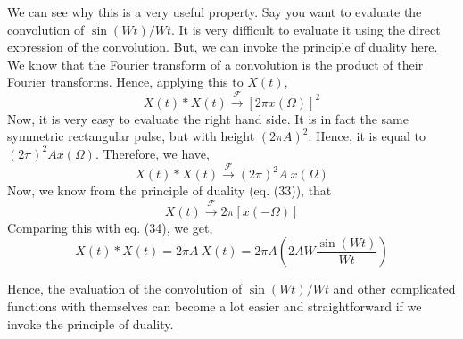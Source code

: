 We can see why this is a very useful property. Say you want to evaluate the convolution of $\sin(Wt)/Wt$. It is very difficult to evaluate it using the direct expression of the convolution. But, we can invoke the principle of duality here. We know that the Fourier transform of a convolution is the product of their Fourier transforms. Hence, applying this to $X(t)$,
\[
X(t)*X(t) \xrightarrow{\mathcal{F}} [2\pi x(\Omega)]^2
\]
Now, it is very easy to evaluate the right hand side. It is in fact the same symmetric rectangular pulse, but with height $(2\pi A)^2$. Hence, it is equal to $(2\pi)^2 A x(\Omega)$. Therefore, we have,
\begin{equation}
X(t)*X(t) \xrightarrow{\mathcal{F}} (2\pi)^2 A \ x(\Omega)
\end{equation}
Now, we know from the principle of duality (eq. (33)), that 
\[
X(t) \xrightarrow{\mathcal{F}} 2\pi [x(-\Omega)]
\]
Comparing this with eq. (34), we get,
\[
X(t)*X(t) = 2\pi A \ X(t) = 2\pi A \left( 2AW \frac{\sin(Wt)}{Wt} \right)
\]

Hence, the evaluation of the convolution of $\sin(Wt)/Wt$ and other complicated functions with themselves can become a lot easier and straightforward if we invoke the principle of duality.

